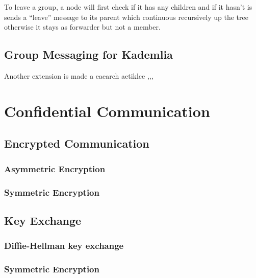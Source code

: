 To leave a group, a node will first check if it has any children and if it hasn't is sends a ``leave'' message to its parent which continuous recursively up the tree otherwise it stays as forwarder but not a member.

 
\subsection{Group Messaging for Kademlia}
Another extension is made a eaearch aetiklce ,,,

\section{Confidential Communication}
\subsection{Encrypted Communication}
\subsubsection{Asymmetric Encryption}
\subsubsection{Symmetric Encryption}

\subsection{Key Exchange}
\subsubsection{Diffie-Hellman key exchange}
\subsubsection{Symmetric Encryption}






